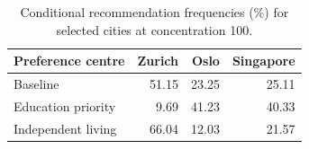 \begin{table}[!ht]\centering
\caption{Conditional recommendation frequencies (\%) for selected cities at concentration 100.}
\begin{tabular}{lrrr}\toprule
Preference centre & Zurich & Oslo & Singapore\\\midrule
Baseline & 51.15 & 23.25 & 25.11 \\
Education priority & 9.69 & 41.23 & 40.33 \\
Independent living & 66.04 & 12.03 & 21.57 \\
\bottomrule\end{tabular}\end{table}
